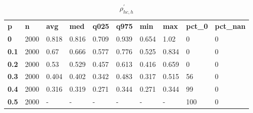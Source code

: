 \begin{table}[h]
 \centering 
\footnotesize
\caption{$\rho_{hc,h}^\prime $}
\label{tab:alphahch}
\begin{tabular}[h]{| l l l l l l l l l l|
    } \hline
\textbf{ p} & \textbf{ n} & \textbf{ avg} & \textbf{ med} & \textbf{ q025} & \textbf{ q975} & \textbf{ min} & \textbf{ max} & \textbf{ pct\_0} & \textbf{ pct\_nan}
           \\
  \textbf{  0} & 2000 & 0.818 & 0.816 & 0.709 & 0.939 & 0.654 &  1.02 &   0 & 0
           \\
  \textbf{0.1} & 2000 &  0.67 & 0.666 & 0.577 & 0.776 & 0.525 & 0.834 &   0 & 0
           \\
  \textbf{0.2} & 2000 &  0.53 & 0.529 & 0.457 & 0.613 & 0.416 & 0.659 &   0 & 0
           \\
  \textbf{0.3} & 2000 & 0.404 & 0.402 & 0.342 & 0.483 & 0.317 & 0.515 &  56 & 0
           \\
  \textbf{0.4} & 2000 & 0.316 & 0.319 & 0.271 & 0.344 & 0.271 & 0.344 &  99 & 0
           \\
  \textbf{0.5} & 2000 & - & - & - & - & - & - & 100 & 0
           \\
 \hline \end{tabular}
 \end{table}
